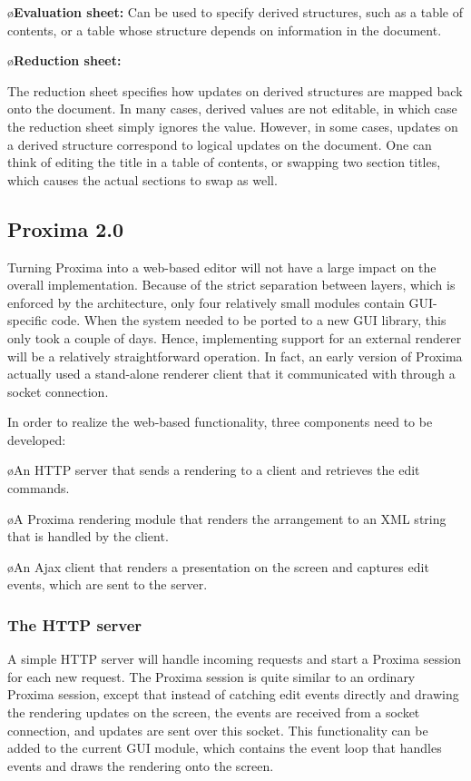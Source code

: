 \documentclass[10pt]{article}
\begin{document}
\bl
\o{\bf Evaluation sheet:}
Can be used to specify derived structures, such as a table of contents, or a table whose structure depends on information in the document. 

\o{\bf Reduction sheet:}

The reduction sheet specifies how updates on derived structures are mapped back onto the document. In many cases, derived values are not editable, in which case the reduction sheet simply ignores the value. However, in some cases, updates on a derived structure correspond to logical updates on the document. One can think of editing the title in a table of contents, or swapping two section titles, which causes the actual sections to swap as well. 
\el


\subsection{Proxima 2.0}

Turning Proxima into a web-based editor will not have a large impact on the overall implementation. Because of the strict separation between layers, which is enforced by the architecture, only four relatively small modules contain GUI-specific code. When the system needed to be ported to a new GUI library, this only took a couple of days. Hence, implementing support for an external renderer will be a relatively straightforward operation. In fact, an early version of Proxima actually used a stand-alone renderer client that it communicated with through a socket connection.

In order to realize the web-based functionality, three components need to be developed:

\bl
\o An HTTP server that sends a rendering to a client and retrieves the edit commands. 

\o A Proxima rendering module that renders the arrangement to an XML string that is handled by the client.

\o An Ajax client that renders a presentation on the screen and captures edit events, which are sent to the server.
\el

\subsubsection{The HTTP server}

A simple HTTP server will handle incoming requests and start a Proxima session for each new request. The Proxima session is quite similar to an ordinary Proxima session, except that instead of catching edit events directly and drawing the rendering updates on the screen, the events are received from a socket connection, and updates are sent over  this socket. This functionality can be added to the current GUI module, which contains the event loop that handles events and draws the rendering onto the screen. 
 
\end{document}
